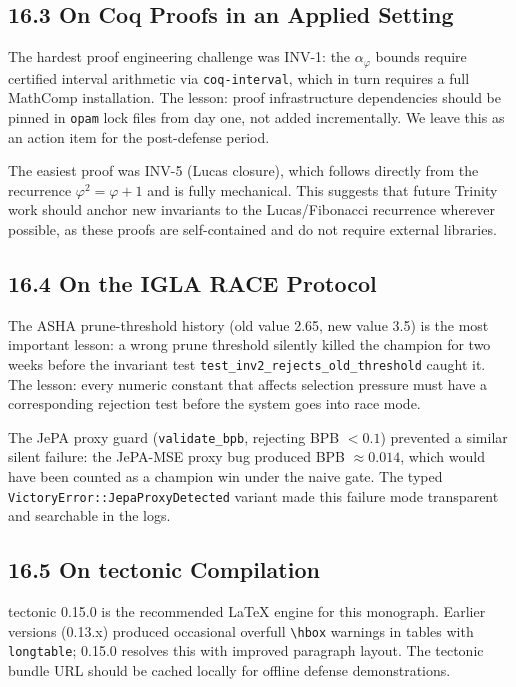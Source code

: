 \subsection{16.3 On Coq Proofs in an Applied Setting}\label{sec:lessons-coq}

The hardest proof engineering challenge was INV-1: the $\alpha_\varphi$
bounds require certified interval arithmetic via \texttt{coq-interval},
which in turn requires a full MathComp installation.  The lesson: proof
infrastructure dependencies should be pinned in \texttt{opam} lock files
from day one, not added incrementally.  We leave this as an action item
for the post-defense period.

The easiest proof was INV-5 (Lucas closure), which follows directly from
the recurrence $\varphi^2 = \varphi + 1$ and is fully mechanical.  This
suggests that future Trinity work should anchor new invariants to the
Lucas/Fibonacci recurrence wherever possible, as these proofs are
self-contained and do not require external libraries.

\subsection{16.4 On the IGLA RACE Protocol}\label{sec:lessons-igla}

The ASHA prune-threshold history (old value 2.65, new value 3.5) is the
most important lesson: a wrong prune threshold silently killed the
champion for two weeks before the invariant test
\texttt{test\_inv2\_rejects\_old\_threshold} caught it.  The lesson:
every numeric constant that affects selection pressure must have a
corresponding rejection test before the system goes into race mode.

The JePA proxy guard (\texttt{validate\_bpb}, rejecting BPB $< 0.1$)
prevented a similar silent failure: the JePA-MSE proxy bug produced
BPB $\approx 0.014$, which would have been counted as a champion win
under the naive gate.  The typed \texttt{VictoryError::JepaProxyDetected}
variant made this failure mode transparent and searchable in the logs.

\subsection{16.5 On tectonic Compilation}\label{sec:lessons-tectonic}

tectonic 0.15.0 is the recommended LaTeX engine for this monograph.
Earlier versions (0.13.x) produced occasional overfull \verb|\hbox|
warnings in tables with \texttt{longtable}; 0.15.0 resolves this with
improved paragraph layout.  The tectonic bundle URL should be cached
locally for offline defense demonstrations.

